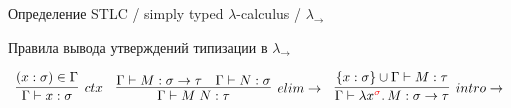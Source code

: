 \begin{frame}{Определение STLC / simply typed $\lambda$-calculus / $\lambda_\to$}
\begin{block}{Правила вывода утверждений типизации в $\lambda_{\rightarrow}$}
            \vspace{-1em}
            \begin{center}
                \[
                    \begin{array}{l c r}
                        \infer[ctx]{\Gamma \vdash x: \sigma}{(x: \sigma) \in \Gamma}
                        &
                        \infer[elim\to]{\Gamma \vdash M\;N : \tau}{\Gamma \vdash M : \sigma \to \tau & \Gamma \vdash N : \sigma}
                        &
                        \infer[intro\to]{\Gamma \vdash \lambda x^{\color{red} \sigma}\ldotp M : \sigma \to \tau}{\{x : \sigma\} \cup \Gamma \vdash M : \tau}
                    \end{array}
                \]
            \end{center}
        \end{block}
    \end{frame}


